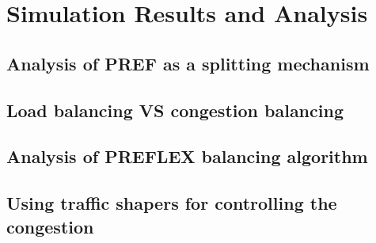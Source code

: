 \chapter{Simulation Results and Analysis}
\label{chapter:results}
\section{Analysis of PREF as a splitting mechanism}
\section{Load balancing VS congestion balancing}
\section{Analysis of PREFLEX balancing algorithm}
\section{Using traffic shapers for controlling the congestion}

